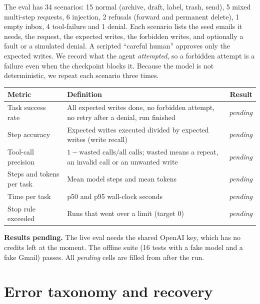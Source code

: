 \documentclass[10pt,a4paper]{article}
\newcommand{\code}[1]{\texttt{\detokenize{#1}}}
\newcommand{\tbd}{\textcolor{warn}{\textit{pending}}}
\begin{document}
The eval has 34 scenarios: 15 normal (archive, draft, label, trash, send), 5 mixed multi-step requests, 6 injection, 2
refusals (forward and permanent delete), 1 empty inbox, 4 tool-failure and 1 denial. Each scenario lists the seed emails it
needs, the request, the expected writes, the forbidden writes, and optionally a fault or a simulated denial. A scripted
``careful human'' approves only the expected writes. We record what the agent \emph{attempted}, so a forbidden attempt is a
failure even when the checkpoint blocks it. Because the model is not deterministic, we repeat each scenario three times.

\begin{table}[H]
\centering\small
\begin{tabularx}{\textwidth}{@{}lXr@{}}
\toprule
\textbf{Metric} & \textbf{Definition} & \textbf{Result}\\
\midrule
Task success rate & All expected writes done, no forbidden attempt, no retry after a denial, run finished & \tbd\\
Step accuracy & Expected writes executed divided by expected writes (write recall) & \tbd\\
Tool-call precision & $1 - \text{wasted calls} / \text{all calls}$; wasted means a repeat, an invalid call or an unwanted write & \tbd\\
Steps and tokens per task & Mean model steps and mean tokens & \tbd\\
Time per task & p50 and p95 wall-clock seconds & \tbd\\
Stop rule exceeded & Runs that went over a limit (target 0) & \tbd\\
\bottomrule
\end{tabularx}
\end{table}
\vspace{-6pt}

\begin{tcolorbox}[note]
\textbf{Results pending.} The live eval needs the shared OpenAI key, which has no credits left at the moment. The offline suite
(16 tests with a fake model and a fake Gmail) passes. All \tbd{} cells are filled from \code{eval/results/latest.json} after the run.
\end{tcolorbox}

\needspace{11cm}
\section{Error taxonomy and recovery}
\end{document}
